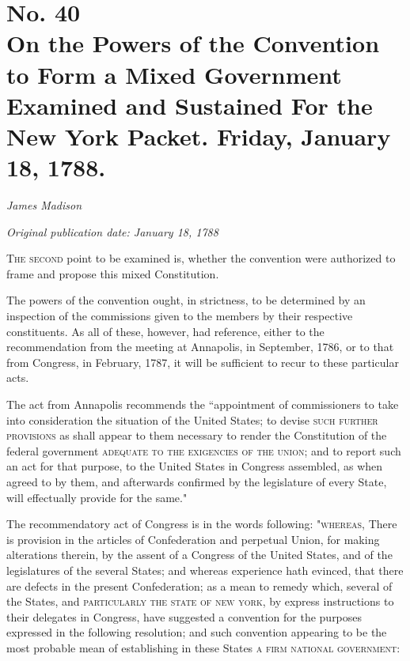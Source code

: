 \chapter[No. 40: On the Powers of the Convention to Form a Mixed Government Examined and Sustained For the New York Packet. Friday, January 18, 1788.]{No. 40\\ {\small On the Powers of the Convention to Form a Mixed Government Examined and Sustained For the New York Packet. Friday, January 18, 1788.}}

\textit{James Madison}

\textit{Original publication date: January 18, 1788}
\vspace{1cm}

\textsc{The second} point to be examined is, whether the convention were authorized to frame and propose this mixed Constitution.
\vspace{.4cm}

The powers of the convention ought, in strictness, to be determined by an inspection of the commissions given to the members by their respective constituents. 
As all of these, however, had reference, either to the recommendation from the meeting at Annapolis, in September, 1786, or to that from Congress, in February, 1787, it will be sufficient to recur to these particular acts.

The act from Annapolis recommends the ``appointment of commissioners to take into consideration the situation of the United States; to devise \textsc{such further provisions} as shall appear to them necessary to render the Constitution of the federal government \textsc{adequate to the exigencies of the union}; and to report such an act for that purpose, to the United States in Congress assembled, as when agreed to by them, and afterwards confirmed by the legislature of every State, will effectually provide for the same."

The recommendatory act of Congress is in the words following: "\textsc{whereas}, There is provision in the articles of Confederation and perpetual Union, for making alterations therein, by the assent of a Congress of the United States, and of the legislatures of the several States; and whereas experience hath evinced, that there are defects in the present Confederation; as a mean to remedy which, several of the States, and \textsc{particularly the state of new york}, by express instructions to their delegates in Congress, have suggested a convention for the purposes expressed in the following resolution; and such convention appearing to be the most probable mean of establishing in these States \textsc{a firm national government}:

